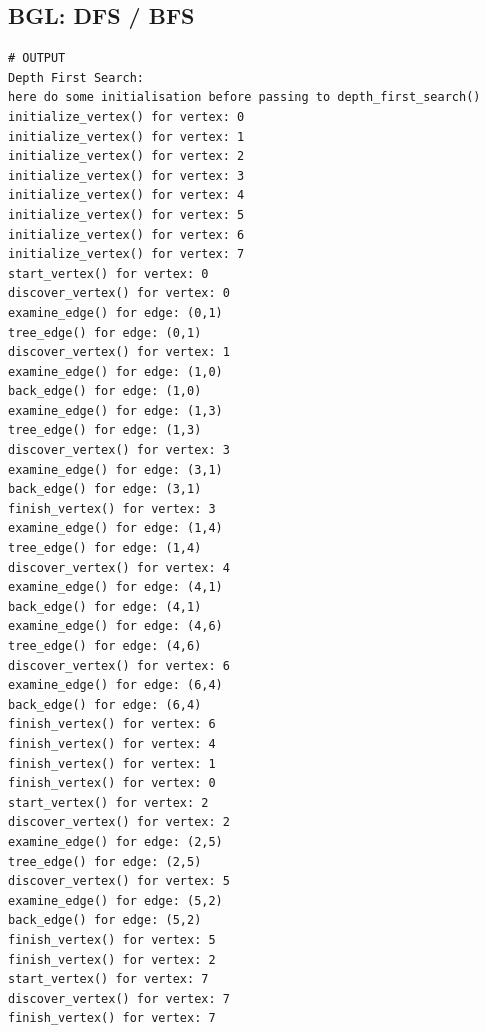 \documentclass[a4paper,titlepage]{article}
\begin{document}
\subsection{BGL: DFS / BFS}

\begin{lstlisting}
# OUTPUT
Depth First Search:
here do some initialisation before passing to depth_first_search()
initialize_vertex() for vertex: 0
initialize_vertex() for vertex: 1
initialize_vertex() for vertex: 2
initialize_vertex() for vertex: 3
initialize_vertex() for vertex: 4
initialize_vertex() for vertex: 5
initialize_vertex() for vertex: 6
initialize_vertex() for vertex: 7
start_vertex() for vertex: 0
discover_vertex() for vertex: 0
examine_edge() for edge: (0,1)
tree_edge() for edge: (0,1)
discover_vertex() for vertex: 1
examine_edge() for edge: (1,0)
back_edge() for edge: (1,0)
examine_edge() for edge: (1,3)
tree_edge() for edge: (1,3)
discover_vertex() for vertex: 3
examine_edge() for edge: (3,1)
back_edge() for edge: (3,1)
finish_vertex() for vertex: 3
examine_edge() for edge: (1,4)
tree_edge() for edge: (1,4)
discover_vertex() for vertex: 4
examine_edge() for edge: (4,1)
back_edge() for edge: (4,1)
examine_edge() for edge: (4,6)
tree_edge() for edge: (4,6)
discover_vertex() for vertex: 6
examine_edge() for edge: (6,4)
back_edge() for edge: (6,4)
finish_vertex() for vertex: 6
finish_vertex() for vertex: 4
finish_vertex() for vertex: 1
finish_vertex() for vertex: 0
start_vertex() for vertex: 2
discover_vertex() for vertex: 2
examine_edge() for edge: (2,5)
tree_edge() for edge: (2,5)
discover_vertex() for vertex: 5
examine_edge() for edge: (5,2)
back_edge() for edge: (5,2)
finish_vertex() for vertex: 5
finish_vertex() for vertex: 2
start_vertex() for vertex: 7
discover_vertex() for vertex: 7
finish_vertex() for vertex: 7



\end{lstlisting}
\end{document}
